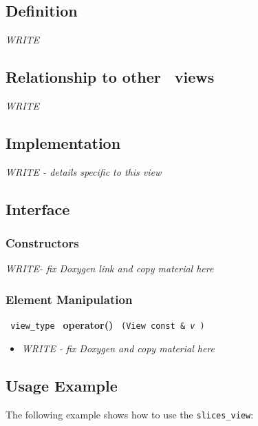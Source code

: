 \subsection{Definition}

\textit{WRITE}

\subsection{Relationship to other \stapl\ views}

\textit{WRITE}

\subsection{Implementation}

\textit{WRITE - details specific to this view}

\subsection{Interface} \label{sec-slc-vw-inter}

\subsubsection{Constructors}

\textit{WRITE-  fix Doxygen link and copy material here}

\subsubsection{ Element Manipulation}

\noindent
\texttt{%
view\_type
}
\newline
\textbf{operator()}%
\texttt{%
(View const \&
\textit{v}%
)
}

\begin{itemize}
\item
\textit{ WRITE - fix Doxygen and copy material here}
\end{itemize}

\subsection{Usage Example} \label{sec-slc-vw-use}

The following example shows how to use the \texttt{slices\_view}:


